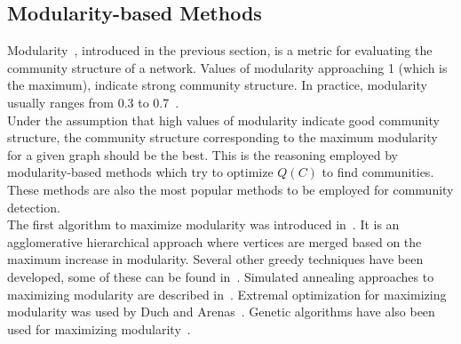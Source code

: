 \begin{spacing}{1.5}
\subsection{Modularity-based Methods}
Modularity~\cite{PhysRevE.69.026113}, introduced in the previous section, is a metric for evaluating the community structure of a network. Values of modularity approaching 1 (which is the maximum), indicate strong community structure. In practice, modularity usually ranges from 0.3 to 0.7~\cite{PhysRevE.69.026113}.\\
\indent Under the assumption that high values of modularity indicate good community structure, the community structure corresponding to the maximum modularity for a given graph should be the best. This is the reasoning employed by modularity-based methods which try to optimize $Q(C)$ to find communities. These methods are also the most popular methods to be employed for community detection.\\%
\indent The first algorithm to maximize modularity was introduced in~\cite{newman03fast}. It is an agglomerative hierarchical approach where vertices are merged based on the maximum increase in modularity. Several other greedy techniques have been developed, some of these can be found in~\cite{blondel2008fuc,Clauset2004,Newman06062006,PhysRevE.74.016107}. Simulated annealing approaches to maximizing modularity are described in~\cite{Guimera04simulatedAnnealingNetworks, PhysRevE.71.046101}. Extremal optimization for maximizing modularity was used by Duch and Arenas~\cite{duch-2005-72}. Genetic algorithms have also been used for maximizing modularity~\cite{2008ppsnpizzuti,6045331, Pizzuti:2012:BDM:2245276.2245321}.\\

\end{spacing}
